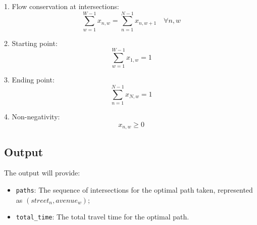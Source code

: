 \documentclass{article}
\begin{document}
1. Flow conservation at intersections:
   \[
   \sum_{w=1}^{W-1} x_{n,w} = \sum_{n=1}^{N-1} x_{n,w+1} \quad \forall n, w
   \]

2. Starting point:
   \[
   \sum_{w=1}^{W-1} x_{1,w} = 1
   \]

3. Ending point:
   \[
   \sum_{n=1}^{N-1} x_{N,w} = 1
   \]

4. Non-negativity:
   \[
   x_{n,w} \geq 0
   \]

\subsection*{Output}

The output will provide:
\begin{itemize}
    \item \texttt{paths}: The sequence of intersections for the optimal path taken, represented as \((street_{n}, avenue_{w})\);
    \item \texttt{total\_time}: The total travel time for the optimal path.
\end{itemize}
\end{document}
